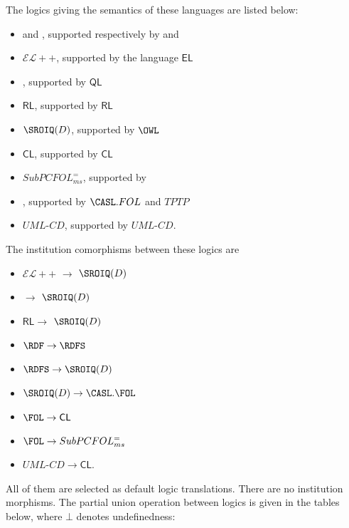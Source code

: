 \documentclass[10pt,fleqn,final]{scrreprt}
\newcommand*{\CL}{\ensuremath{\mathsf{CL}}\xspace}
\newcommand{\QL}{\ensuremath{\mathsf{QL}}\xspace}
\newcommand{\RL}{\ensuremath{\mathsf{RL}}\xspace}
\newcommand{\EL}{\ensuremath{\mathsf{EL}}\xspace}
\newcommand{\ELDL}{\ensuremath{\mathcal{EL}}\xspace}
\begin{document}
The logics giving the semantics of these languages are listed below:
\begin{itemize}
 \item \RDF and \RDFS, supported respectively by \RDF and \RDFS
 \item $\ELDL{+}{+}$, supported by the language \EL
 \item \DLLiteR, supported by \QL
 \item \RL, supported by \RL
 \item $\SROIQ(D)$, supported by $\OWL$
 \item \CL, supported by \CL
 \item $SubPCFOL^=_{ms}$, supported by \CASL
 \item \FOL, supported by $\CASL.FOL$ and $TPTP$
 \item $UML\mbox{-}CD$, supported by $UML\mbox{-}CD$.
\end{itemize}

The institution comorphisms between these logics are
\begin{itemize}
  \item $\ELDL{+}{+}$ $\to$ $\SROIQ(D)$ 
  \item \DLLiteR $\to$ $\SROIQ(D)$ 
  \item \RL $\to$ $\SROIQ(D)$ 
  \item $\RDF \to \RDFS$
  \item $\RDFS \to \SROIQ(D)$ 
  \item $\SROIQ(D)  \to \CASL.\FOL$
  \item $\FOL \to \CL$
  \item $\FOL \to SubPCFOL^=_{ms}$
  \item $UML\mbox{-}CD \to \CL$.
\end{itemize}

All of them are selected as default logic translations. There are no institution morphisms. The partial union operation between logics is given in the tables below, where
$\bot$ denotes undefinedness:
\end{document}
